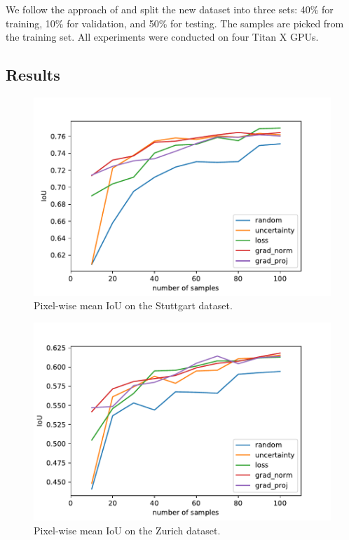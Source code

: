 \documentclass[letterpaper, 10 pt, conference]{ieeeconf}  %
\begin{document}
We follow the approach of \cite{milioto2018real} and split the new dataset into three sets: 40\% for training, 10\% for validation, and 50\% for testing. The samples are picked from the training set. All experiments were conducted on four Titan X GPUs.  

\subsection{Results}


    \begin{figure}
    \centering
    \includegraphics[width=\linewidth]{pics/pw_iou_stuttgart.pdf}
   		\caption{Pixel-wise mean IoU on the Stuttgart dataset.}
		\label{fig:iou_stuttgart}    		
   \end{figure}
   
    \begin{figure}
    \centering
    \includegraphics[width=\linewidth]{pics/pw_iou_zurich.pdf}
   		\caption{Pixel-wise mean IoU on the Zurich dataset.}
		\label{fig:iou_zurich}    		
   \end{figure}
   
\end{document}
